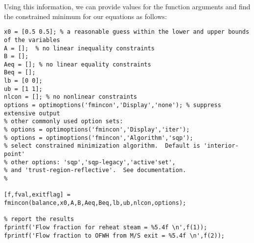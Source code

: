 Using this information, we can provide values for the function arguments and find the constrained minimum for our equations as follows:

\begin{lstlisting}[caption=Set arguments and call FMINCON to find constrained minimum]
x0 = [0.5 0.5]; % a reasonable guess within the lower and upper bounds of the variables
A = [];  % no linear inequality constraints
B = [];
Aeq = []; % no linear equality constraints
Beq = [];
lb = [0 0];
ub = [1 1];
nlcon = []; % no nonlinear constraints
options = optimoptions('fmincon','Display','none'); % suppress extensive output
% other commonly used option sets:
% options = optimoptions('fmincon','Display','iter');
% options = optimoptions('fmincon','Algorithm','sqp');
% select constrained minimization algorithm.  Default is 'interior-point'
% other options: 'sqp','sqp-legacy','active'set',
% and 'trust-region-reflective'.  See documentation.
%

[f,fval,exitflag] = fmincon(balance,x0,A,B,Aeq,Beq,lb,ub,nlcon,options);

% report the results
fprintf('Flow fraction for reheat steam = %5.4f \n',f(1));
fprintf('Flow fraction to OFWH from M/S exit = %5.4f \n',f(2));
\end{lstlisting}

  

